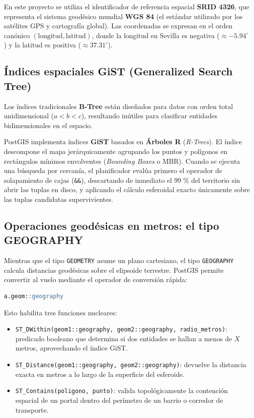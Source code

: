 \documentclass[a4paper,12pt]{article}
\begin{document}
En este proyecto se utiliza el identificador de referencia espacial \textbf{SRID 4326}, que representa el sistema geodésico mundial \textbf{WGS 84} (el estándar utilizado por los satélites GPS y cartografía global). Las coordenadas se expresan en el orden canónico $(\text{longitud}, \text{latitud})$, donde la longitud en Sevilla es negativa ($\approx -5.94^\circ$) y la latitud es positiva ($\approx 37.31^\circ$).

\subsection{Índices espaciales GiST (Generalized Search Tree)}
Los índices tradicionales \textbf{B-Tree} están diseñados para datos con orden total unidimensional ($a < b < c$), resultando inútiles para clasificar entidades bidimensionales en el espacio. 

PostGIS implementa índices \textbf{GiST} basados en \textbf{Árboles R} (\textit{R-Trees}). El índice descompone el mapa jerárquicamente agrupando los puntos y polígonos en rectángulos mínimos envolventes (\textit{Bounding Boxes} o MBR). Cuando se ejecuta una búsqueda por cercanía, el planificador evalúa primero el operador de solapamiento de cajas (\texttt{\&\&}), descartando de inmediato el 99 \% del territorio sin abrir las tuplas en disco, y aplicando el cálculo esferoidal exacto únicamente sobre las tuplas candidatas supervivientes.

\subsection{Operaciones geodésicas en metros: el tipo GEOGRAPHY}
Mientras que el tipo \texttt{GEOMETRY} asume un plano cartesiano, el tipo \texttt{GEOGRAPHY} calcula distancias geodésicas sobre el elipsoide terrestre. PostGIS permite convertir al vuelo mediante el operador de conversión rápida:
\begin{lstlisting}[language=SQL]
a.geom::geography
\end{lstlisting}
Esto habilita tres funciones nucleares:
\begin{itemize}[leftmargin=1.0cm]
  \item \texttt{ST\_DWithin(geom1::geography, geom2::geography, radio\_metros)}: predicado booleano que determina si dos entidades se hallan a menos de $X$ metros, aprovechando el índice GiST.
  \item \texttt{ST\_Distance(geom1::geography, geom2::geography)}: devuelve la distancia exacta en metros a lo largo de la superficie del esferoide.
  \item \texttt{ST\_Contains(poligono, punto)}: valida topológicamente la contención espacial de un portal dentro del perímetro de un barrio o corredor de transporte.
\end{itemize}
\end{document}
